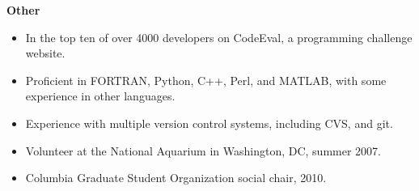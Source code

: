 \vspace{\mybigskip}
\myfontsize{\littleheader}
\textbf{Other}\\
\myfontsize{\bodysize}
\begin{itemize}[topsep=1ex, partopsep=0ex, parsep=0ex, itemsep=0.5ex]
    \item In the top ten of over 4000 developers on CodeEval, a programming challenge website.\\
    \item Proficient in FORTRAN, Python, C++, Perl, and MATLAB, with some experience in other languages.\\
    \item Experience with multiple version control systems, including CVS, and git.\\
    \item Volunteer at the National Aquarium in Washington, DC, summer 2007.\\
    \item Columbia Graduate Student Organization social chair, 2010.
\end{itemize}

